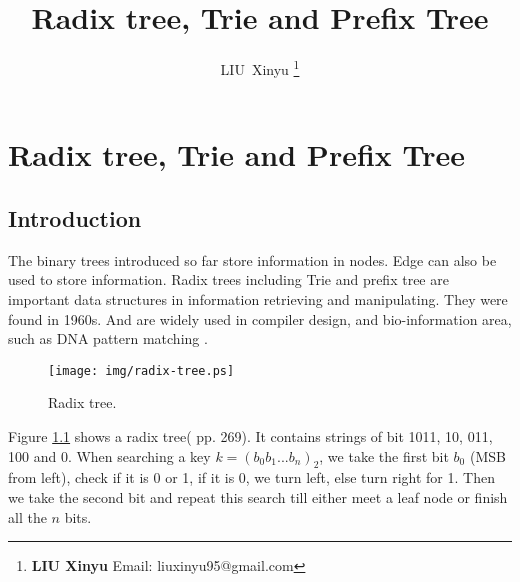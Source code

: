 \documentclass{article}
\begin{document}


\title{Radix tree, Trie and Prefix Tree}

\author{LIU~Xinyu
\thanks{{\bfseries LIU Xinyu } \newline
  Email: liuxinyu95@gmail.com \newline}
  }

\maketitle
\fi


\ifx\wholebook\relax
\chapter{Radix tree, Trie and Prefix Tree}
\fi



\section{Introduction}
\label{introduction}

The binary trees introduced so far store information in nodes. Edge
can also be used to store information.
Radix trees including Trie and prefix tree are important data structures in
information retrieving and manipulating.
They were found in 1960s. And are widely used in
compiler design\cite{okasaki-int-map}, and bio-information area, such as
DNA pattern matching \cite{wiki-suffix-tree}.

\begin{figure}[htbp]
  \centering
  \texttt{[image: img/radix-tree.ps]}
  \caption{Radix tree.} \label{fig:radix-tree}
\end{figure}

Figure \ref{fig:radix-tree} shows a radix tree(\cite{CLRS} pp. 269).
It contains strings of bit 1011, 10, 011, 100 and 0.
When searching a key $k=(b_0b_1...b_n)_2$, we
take the first bit $b_0$ (MSB from left), check if it is 0 or 1, if it
is 0, we turn left, else turn right for 1. Then we take the second bit and
repeat this search till either meet a leaf node or finish all the $n$ bits.
\end{document}
